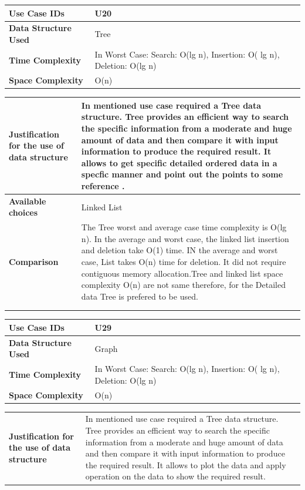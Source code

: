 \documentclass[12pt,a4paper]{report}
\begin{document}
\begin{center}
\begin{tabular}{ | m{4cm}|m{12cm}| }\hline
\textbf{Use Case IDs}& U20 \\ \hline
\textbf{Data Structure Used}& Tree \\ \hline

\textbf{Time Complexity}& 
In Worst Case: Search: O(lg n), Insertion: O( lg n), Deletion: O(lg n)\\\hline
\textbf{Space Complexity}& O(n)\\\hline

 \end{tabular}
\begin{tabular}{ | m{4cm}|m{12cm}| }\hline
\textbf{Justification for the use of data structure}&
In mentioned use case required a Tree data structure. 
Tree provides an efficient way to search the specific information from a moderate and huge amount of data and then compare it with input information to produce the required result. It allows to get specific detailed ordered data in a specfic manner and point out the points to some reference .
 
 \\ \hline
\textbf{Available choices}& Linked List \\ \hline
\textbf{Comparison}&
The Tree worst and average case time complexity is O(lg n). In the average and worst case, the linked list insertion and deletion take O(1) time. IN the average and worst case, List takes O(n) time for deletion. It did not require contiguous memory allocation.Tree and linked list space complexity O(n) are not same therefore, for the Detailed  data Tree is prefered to be used.
 \\ 
\\ 
 \\
 \hline
\end{tabular}


\begin{tabular}{ | m{4cm}|m{12cm}| }\hline
\textbf{Use Case IDs}& U29 \\ \hline
\textbf{Data Structure Used}& Graph \\ \hline

\textbf{Time Complexity}& 
In Worst Case: Search: O(lg n), Insertion: O( lg n), Deletion: O(lg n)\\\hline
\textbf{Space Complexity}& O(n)\\\hline

 \end{tabular}
\begin{tabular}{ | m{4cm}|m{12cm}| }\hline
\textbf{Justification for the use of data structure}&
In mentioned use case required a Tree data structure. 
Tree provides an efficient way to search the specific information from a moderate and huge amount of data and then compare it with input information to produce the required result. It allows to plot the data and apply operation on the data to show the required result.
 

\end{tabular}
\end{center}
\end{document}

